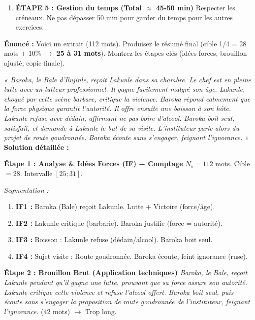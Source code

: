 \documentclass[11pt]{article}
\begin{document}
\begin{methode}
\begin{enumerate}
\begin{itemize}
                \item \textbf{Recompter impérativement} sur la copie finale. Écrire le nombre de mots en bas à droite.
            \end{itemize}
        \item \textbf{ÉTAPE 5 : Gestion du temps (Total $\approx$ 45-50 min)} Respecter les créneaux. Ne pas dépasser 50 min pour garder du temps pour les autres exercices.
    \end{enumerate}
\end{methode}

\begin{exoresolu}
    \textbf{Énoncé :} Voici un extrait (112 mots). Produisez le résumé final (cible 1/4 = 28 mots $\pm$ 10\% $\rightarrow$ \textbf{25 à 31 mots}). Montrez les étapes clés (idées forces, brouillon ajusté, copie finale).
    
    \textit{« Baroka, le Bale d'Ilujinle, reçoit Lakunle dans sa chambre. Le chef est en pleine lutte avec un lutteur professionnel. Il gagne facilement malgré son âge. Lakunle, choqué par cette scène barbare, critique la violence. Baroka répond calmement que la force physique garantit l'autorité. Il offre ensuite une boisson à son hôte. Lakunle refuse avec dédain, affirmant ne pas boire d'alcool. Baroka boit seul, satisfait, et demande à Lakunle le but de sa visite. L'instituteur parle alors du projet de route goudronnée. Baroka écoute sans s'engager, feignant l'ignorance. »}
    \tcblower
    \textbf{Solution détaillée :}
    
    \textbf{Étape 1 : Analyse \& Idées Forces (IF) + Comptage}
    $N_s = 112$ mots. Cible $= 28$. Intervalle $[25; 31]$.
    
    \textit{Segmentation :}
    \begin{enumerate}
        \item \textbf{IF1 :} Baroka (Bale) reçoit Lakunle. Lutte + Victoire (force/âge).
        \item \textbf{IF2 :} Lakunle critique (barbarie). Baroka justifie (force = autorité).
        \item \textbf{IF3 :} Boisson : Lakunle refuse (dédain/alcool). Baroka boit seul.
        \item \textbf{IF4 :} Sujet visite : Route goudronnée. Baroka écoute, feint ignorance (ruse).
    \end{enumerate}
    
    \textbf{Étape 2 : Brouillon Brut (Application techniques)}
    \emph{Baroka, le Bale, reçoit Lakunle pendant qu'il gagne une lutte, prouvant que sa force assure son autorité. Lakunle critique cette violence et refuse l'alcool offert. Baroka boit seul, puis écoute sans s'engager la proposition de route goudronnée de l'instituteur, feignant l'ignorance.} (42 mots) $\rightarrow$ Trop long.
    

\end{exoresolu}
\end{document}

